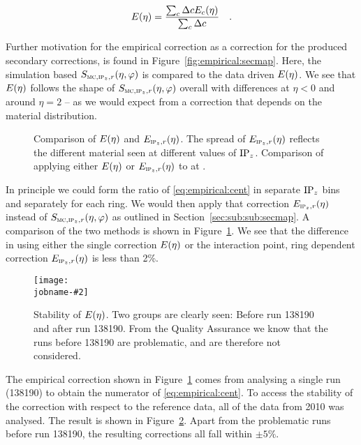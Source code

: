 \documentclass[compat,11pt]{alicenote}
\newcommand*{\etaphi}{\ensuremath(\eta,\varphi)}
\newcommand*\SecMap{\ensuremath S_{\subMC,\subIPz,r}\etaphi}
\newcommand*\EmpCor[1][]{\ensuremath E\ifx|#1|\relax\else_{#1}\fi(\eta)}
\newcommand{\secref}[1]{Section~\ref{#1}}
\newcommand{\figref}[1]{Figure~\ref{#1}}
\newcommand\figinput[2][\textwidth]{%
  \texttt{[image: \\jobname-\#2]}}
\begin{document}
\begin{equation}
  \label{eq:empirical}
  \EmpCor{} = \frac{\sum_c \Delta c\EmpCor[c]{}}{\sum_c \Delta c}\quad.
\end{equation}

Further motivation for the empirical correction as a correction
for the produced secondary corrections, is found in
\figref{fig:empirical:secmap}.  Here, the simulation based $\SecMap$
is compared to the data driven $\EmpCor$.  We see that $\EmpCor$
follows the shape of $\SecMap$ overall with differences at $\eta<0$
and around $\eta=2$ -- as we would expect from a correction that
depends on the material distribution. 

\begin{figure}[h!tbp]
  \centering
  \subfigure[]{
    \label{fig:empirical:compare_es}\figinput[.55\linewidth]{compare_es}}
  \subfigure[]{
    \label{fig:empirical:es_pp0900}\figinput[.35\linewidth]{es_pp0900}}
  \caption{ Comparison of $\EmpCor$ and
    $\EmpCor[\subIPz,r]{}$.  The spread of $\EmpCor[\subIPz,r]{}$
    reflects the different material seen at different values of
    $\IPz$.    Comparison of applying
    either $\EmpCor$ or $\EmpCor[\subIPz,r]{}$ to \ppCol{} at
    . }
  \label{fig:empirical:methods}
\end{figure}

In principle we could form the ratio of \eqref{eq:empirical:cent} in
separate $\IPz$ bins and separately for each \FMD{} ring.  We would
then apply that correction $\EmpCor[\subIPz,r]{}$ instead of $\SecMap$
as outlined in \secref{sec:sub:sub:secmap}.  A comparison of the two
methods is shown in \figref{fig:empirical:methods}.  We see that the
difference in using either the single correction $\EmpCor$ or the
interaction point, ring dependent correction $\EmpCor[\subIPz,r]{}$ is
less than 2\%.

\begin{figure}[h!tbp]
  \centering
  \figinput[.9\linewidth]{empcor_stable}
  \caption{Stability of $\EmpCor$.  Two groups are clearly seen:
    Before run 138190 and after run 138190.  From the Quality
    Assurance we know that the runs before 138190 are problematic, and
    are therefore not considered. }
  \label{fig:empirical:empcor_stable}
\end{figure}

The empirical correction shown in \figref{fig:empirical:methods} comes
from analysing a single run (138190) to obtain the numerator of
\eqref{eq:empirical:cent}.  To access the stability of the correction
with respect to the reference data, all of the \PbPbCol{} data from
2010 was analysed.  The result is shown in
\figref{fig:empirical:empcor_stable}.  Apart from the problematic runs
before run 138190, the resulting corrections all fall within
$\pm5\%$. 
\end{document}
